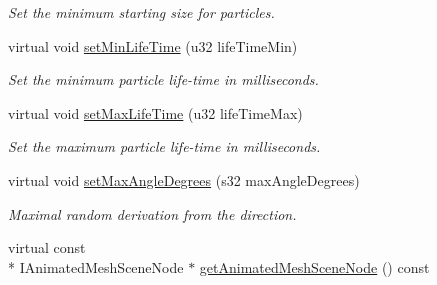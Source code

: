 \begin{DoxyCompactItemize}
\begin{DoxyCompactList}\small\item\em Set the minimum starting size for particles. \end{DoxyCompactList}\item 
\hypertarget{classirr_1_1scene_1_1_c_particle_animated_mesh_scene_node_emitter_a10452cc14f40ce43532f936674f70ff5}{virtual void \hyperlink{classirr_1_1scene_1_1_c_particle_animated_mesh_scene_node_emitter_a10452cc14f40ce43532f936674f70ff5}{set\-Min\-Life\-Time} (u32 life\-Time\-Min)}\label{classirr_1_1scene_1_1_c_particle_animated_mesh_scene_node_emitter_a10452cc14f40ce43532f936674f70ff5}

\begin{DoxyCompactList}\small\item\em Set the minimum particle life-\/time in milliseconds. \end{DoxyCompactList}\item 
\hypertarget{classirr_1_1scene_1_1_c_particle_animated_mesh_scene_node_emitter_ae9b227ab156d49b0ca42820314e9498a}{virtual void \hyperlink{classirr_1_1scene_1_1_c_particle_animated_mesh_scene_node_emitter_ae9b227ab156d49b0ca42820314e9498a}{set\-Max\-Life\-Time} (u32 life\-Time\-Max)}\label{classirr_1_1scene_1_1_c_particle_animated_mesh_scene_node_emitter_ae9b227ab156d49b0ca42820314e9498a}

\begin{DoxyCompactList}\small\item\em Set the maximum particle life-\/time in milliseconds. \end{DoxyCompactList}\item 
\hypertarget{classirr_1_1scene_1_1_c_particle_animated_mesh_scene_node_emitter_a68c8f4a663c064bdd2260682eb39012c}{virtual void \hyperlink{classirr_1_1scene_1_1_c_particle_animated_mesh_scene_node_emitter_a68c8f4a663c064bdd2260682eb39012c}{set\-Max\-Angle\-Degrees} (s32 max\-Angle\-Degrees)}\label{classirr_1_1scene_1_1_c_particle_animated_mesh_scene_node_emitter_a68c8f4a663c064bdd2260682eb39012c}

\begin{DoxyCompactList}\small\item\em Maximal random derivation from the direction. \end{DoxyCompactList}\item 
\hypertarget{classirr_1_1scene_1_1_c_particle_animated_mesh_scene_node_emitter_a6b652e48e1866b8b777de0a581692a74}{virtual const \\*
I\-Animated\-Mesh\-Scene\-Node $\ast$ \hyperlink{classirr_1_1scene_1_1_c_particle_animated_mesh_scene_node_emitter_a6b652e48e1866b8b777de0a581692a74}{get\-Animated\-Mesh\-Scene\-Node} () const }\label{classirr_1_1scene_1_1_c_particle_animated_mesh_scene_node_emitter_a6b652e48e1866b8b777de0a581692a74}


\end{DoxyCompactItemize}
